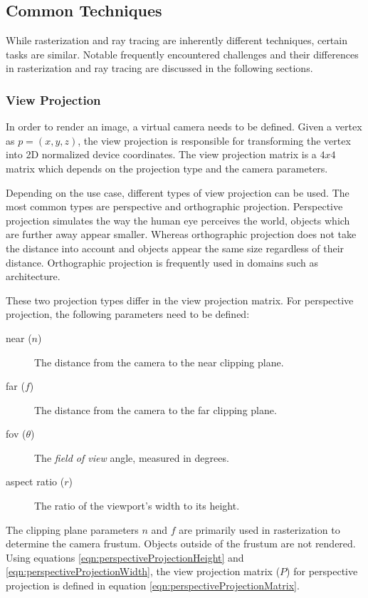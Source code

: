 \subsection{Common Techniques}

While rasterization and ray tracing are inherently different techniques, certain tasks are similar. Notable frequently encountered challenges and their differences in rasterization and ray tracing are discussed in the following sections.

\subsubsection{View Projection}
\label{sec:viewProjection}

In order to render an image, a virtual camera needs to be defined. Given a vertex as $p = (x, y, z)$, the view projection is responsible for transforming the vertex into 2D normalized device coordinates. The view projection matrix is a $4x4$ matrix which depends on the projection type and the camera parameters.

Depending on the use case, different types of view projection can be used. The most common types are perspective and orthographic projection. Perspective projection simulates the way the human eye perceives the world, objects which are further away appear smaller. Whereas orthographic projection does not take the distance into account and objects appear the same size regardless of their distance. Orthographic projection is frequently used in domains such as architecture.

These two projection types differ in the view projection matrix. For perspective projection, the following parameters need to be defined:

\begin{description}
    \item[near ($n$)] The distance from the camera to the near clipping plane.
    \item[far ($f$)] The distance from the camera to the far clipping plane.
    \item[fov ($\theta$)] The \textit{field of view} angle, measured in degrees.
    \item[aspect ratio ($r$)] The ratio of the viewport's width to its height.
\end{description}

The clipping plane parameters $n$ and $f$ are primarily used in rasterization to determine the camera frustum. Objects outside of the frustum are not rendered. Using equations \ref{eqn:perspectiveProjectionHeight} and \ref{eqn:perspectiveProjectionWidth}, the view projection matrix ($P$) for perspective projection is defined in equation \ref{eqn:perspectiveProjectionMatrix}.

